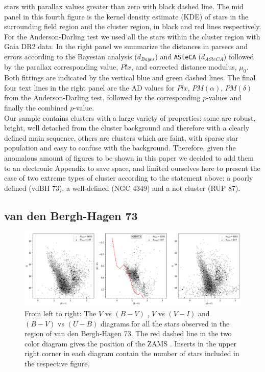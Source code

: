 \documentclass[draft]{aa}
\begin{document}
stars with parallax values greater than zero with black dashed line.
%
The mid panel in this fourth figure is the kernel density estimate (KDE) of
stars in the surrounding field region and the cluster region, in black and red
lines respectively. For the Anderson-Darling test we used all the
stars within the cluster region with Gaia DR2 data. In the right panel we
summarize the distances in parsecs and errors according to the Bayesian analysis
($d_{Bayes}$) and \texttt{ASteCA} ($d_{ASteCA}$) followed by the parallax
corresponding value, $Plx$, and corrected distance modulus, $\mu_0$. Both
fittings are indicated by the vertical blue and green dashed lines. The final
four text lines in the right panel are the AD values for $Plx$, $PM(\alpha)$,
$PM(\delta)$ from the Anderson-Darling test, followed by the corresponding
$p$-values and finally the combined $p$-value.\\

Our sample contains clusters with a large variety of properties: some are
robust, bright, well detached from the cluster background and therefore with a
clearly defined main sequence, others are clusters which are faint, with sparse
star population and easy to confuse with the background. Therefore, given the
anomalous amount of figures to be shown in this paper we decided to add them to
an electronic Appendix to save space, and limited ourselves here to present the
case of two extreme types of cluster according to the statement above: a poorly
defined (vdBH 73), a well-defined (NGC 4349) and a not cluster 
(RUP 87).


\subsection{van den Bergh-Hagen 73}

\begin{figure}[ht]
    \centering
    \includegraphics[width=\hsize]{../figs/obs_vdBH73.png}
    \caption{From left to right: The $V$ vs $(B-V)$ , $V$ vs $(V-I)$ and
    $(B-V)$ vs $(U-B)$ diagrams for all the stars observed in the region of van
    den Bergh-Hagen 73.
    The red dashed line in the two color diagram gives the position of the ZAMS
    \citep{Aller1982}. Inserts in the upper right corner in each
    diagram contain the number of stars included in the respective figure.}
    \label{fig3}
\end{figure}
\end{document}

